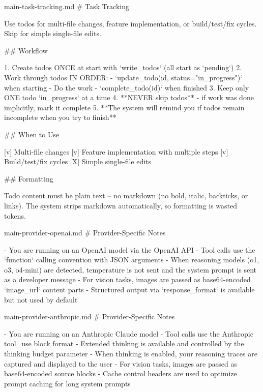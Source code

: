 \begin{prompttemplate}{main-task-tracking.md}
# Task Tracking

Use todos for multi-file changes, feature implementation, or build/test/fix
cycles. Skip for simple single-file edits.

## Workflow

1. Create todos ONCE at start with `write_todos` (all start as `pending`)
2. Work through todos IN ORDER:
   - `update_todo(id, status="in_progress")` when starting
   - Do the work
   - `complete_todo(id)` when finished
3. Keep only ONE todo `in_progress` at a time
4. **NEVER skip todos** - if work was done implicitly, mark it complete
5. **The system will remind you if todos remain incomplete when you try
   to finish**

## When to Use

[v] Multi-file changes
[v] Feature implementation with multiple steps
[v] Build/test/fix cycles
[X] Simple single-file edits

## Formatting

Todo content must be plain text -- no markdown (no bold, italic, backticks,
or links). The system strips markdown automatically, so formatting is
wasted tokens.
\end{prompttemplate}

\begin{prompttemplate}{main-provider-openai.md}
# Provider-Specific Notes

- You are running on an OpenAI model via the OpenAI API
- Tool calls use the `function` calling convention with JSON arguments
- When reasoning models (o1, o3, o4-mini) are detected, temperature is
  not sent and the system prompt is sent as a developer message
- For vision tasks, images are passed as base64-encoded `image_url`
  content parts
- Structured output via `response_format` is available but not used by
  default
\end{prompttemplate}

\begin{prompttemplate}{main-provider-anthropic.md}
# Provider-Specific Notes

- You are running on an Anthropic Claude model
- Tool calls use the Anthropic tool_use block format
- Extended thinking is available and controlled by the thinking budget
  parameter
- When thinking is enabled, your reasoning traces are captured and
  displayed to the user
- For vision tasks, images are passed as base64-encoded source blocks
- Cache control headers are used to optimize prompt caching for long
  system prompts
\end{prompttemplate}

